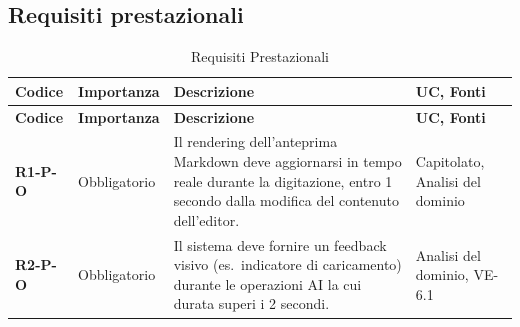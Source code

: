 \subsection{Requisiti prestazionali}
\begin{longtable}{|p{2.5cm}|p{2.2cm}|p{6.8cm}|p{2.7cm}|}
	\caption{Requisiti Prestazionali} \\
	\hline
	\rowcolor{primarycolor!10}
	\textbf{Codice} & \textbf{Importanza} & \textbf{Descrizione} & \textbf{UC, Fonti} \\
	\hline
	\endfirsthead
	\hline
	\rowcolor{primarycolor!10}
	\textbf{Codice} & \textbf{Importanza} & \textbf{Descrizione} & \textbf{UC, Fonti} \\
	\hline
	\endhead

	\textbf{R1-P-O} & Obbligatorio & Il rendering dell'anteprima Markdown deve aggiornarsi in tempo reale durante la digitazione, entro 1 secondo dalla modifica del contenuto dell’editor. & Capitolato, Analisi del dominio \\ \hline
	\textbf{R2-P-O} & Obbligatorio & Il sistema deve fornire un feedback visivo (es.\ indicatore di caricamento) durante le operazioni AI la cui durata superi i 2 secondi. & Analisi del dominio, VE-6.1 \\ \hline

\end{longtable}